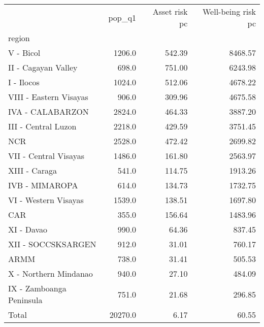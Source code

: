 \begin{tabular}{lrrr}
\toprule
{} &   pop\_q1 &  Asset risk pc &  Well-being risk pc \\
region                   &          &                &                     \\
\midrule
V - Bicol                &   1206.0 &         542.39 &             8468.57 \\
II - Cagayan Valley      &    698.0 &         751.00 &             6243.98 \\
I - Ilocos               &   1024.0 &         512.06 &             4678.22 \\
VIII - Eastern Visayas   &    906.0 &         309.96 &             4675.58 \\
IVA - CALABARZON         &   2824.0 &         464.33 &             3887.20 \\
III - Central Luzon      &   2218.0 &         429.59 &             3751.45 \\
NCR                      &   2528.0 &         472.42 &             2699.82 \\
VII - Central Visayas    &   1486.0 &         161.80 &             2563.97 \\
XIII - Caraga            &    541.0 &         114.75 &             1913.26 \\
IVB - MIMAROPA           &    614.0 &         134.73 &             1732.75 \\
VI - Western Visayas     &   1539.0 &         138.51 &             1697.80 \\
CAR                      &    355.0 &         156.64 &             1483.96 \\
XI - Davao               &    990.0 &          64.36 &              837.45 \\
XII - SOCCSKSARGEN       &    912.0 &          31.01 &              760.17 \\
ARMM                     &    738.0 &          31.41 &              505.53 \\
X - Northern Mindanao    &    940.0 &          27.10 &              484.09 \\
IX - Zamboanga Peninsula &    751.0 &          21.68 &              296.85 \\
Total                    &  20270.0 &           6.17 &               60.55 \\
\bottomrule
\end{tabular}
